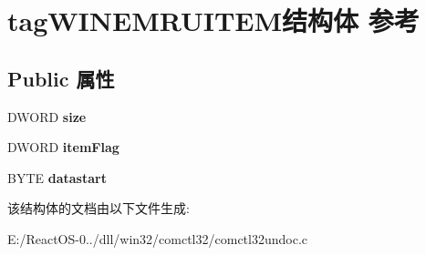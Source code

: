 \hypertarget{structtag_w_i_n_e_m_r_u_i_t_e_m}{}\section{tag\+W\+I\+N\+E\+M\+R\+U\+I\+T\+E\+M结构体 参考}
\label{structtag_w_i_n_e_m_r_u_i_t_e_m}
\subsection*{Public 属性}
\begin{DoxyCompactItemize}
\item 
\mbox{\label{structtag_w_i_n_e_m_r_u_i_t_e_m_a810967fe00fb167153be888611e0ef4c}} 
D\+W\+O\+RD {\bfseries size}
\item 
\mbox{\label{structtag_w_i_n_e_m_r_u_i_t_e_m_abb88ba1ccc5e6b15f58fe99180959ffd}} 
D\+W\+O\+RD {\bfseries item\+Flag}
\item 
\mbox{\label{structtag_w_i_n_e_m_r_u_i_t_e_m_a2b38b80a7e5ccc72ca3406255e8badd5}} 
B\+Y\+TE {\bfseries datastart}
\end{DoxyCompactItemize}


该结构体的文档由以下文件生成\+:\begin{DoxyCompactItemize}
\item 
E\+:/\+React\+O\+S-\/0../dll/win32/comctl32/comctl32undoc.\+c\end{DoxyCompactItemize}
